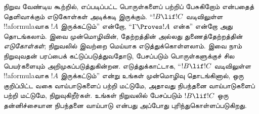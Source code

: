 \documentclass[../../../include/open-logic-section]{subfiles}
\begin{document}
நிறுவ வேண்டிய கூற்றில், எப்படிப்பட்ட பொருள்களைப் பற்றிப்
பேசுகிறோம் என்பதைத் தெளிவாக்கும் எடுகோள்கள் அடிக்கடி இருக்கும்.
``$!B \lif !C$ வடிவிலுள்ள !!a{formula}வாக $!A$ இருக்கட்டும்''
என்றோ, ``$\Gamma \Proves !A$ என்க'' என்றோ அது தொடங்கலாம்.
இவை முன்மொழிவின், தேற்றத்தின் அல்லது துணைத்தேற்றத்தின்
\emph{எடுகோள்கள்}; நிறுவலில் இவற்றை மெய்யாக எடுத்துக்கொள்ளலாம்.
இவை நாம் நிறுவுவதன் பரப்பைக் கட்டுப்படுத்துவதோடு, பேசப்படும்
பொருள்களுக்குச் சில பெயர்களையும் அறிமுகப்படுத்துகின்றன.
எடுத்துக்காட்டாக, ``$!B \lif !C$ வடிவிலுள்ள !!a{formula}வாக
$!A$ இருக்கட்டும்'' என்று உங்கள் முன்மொழிவு தொடங்கினால்,
ஒரு குறிப்பிட்ட வகை வாய்பாடுகளைப் பற்றி மட்டுமே, அதாவது
நிபந்தனை வாய்பாடுகளைப் பற்றி மட்டுமே, நிறுவுகிறீர்கள்.
உங்கள் நிறுவலில் பேசப்படும் $!B \lif !C$ ஒரு தன்னிச்சையான
நிபந்தனை வாய்பாடு என்பது அப்போது புரிந்துகொள்ளப்படுகிறது.
\end{document}

